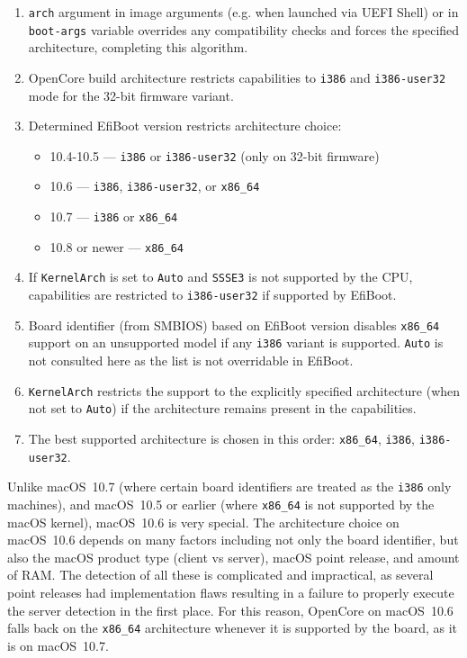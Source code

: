 \documentclass[]{article}
\providecommand{\tightlist}{%
  \setlength{\itemsep}{0pt}\setlength{\parskip}{0pt}}
\begin{document}
\begin{enumerate}
  \begin{enumerate}
    \tightlist
    \item \texttt{arch} argument in image arguments (e.g. when launched
    via UEFI Shell) or in \texttt{boot-args} variable overrides any compatibility
    checks and forces the specified architecture, completing this algorithm.
    \item OpenCore build architecture restricts capabilities to \texttt{i386}
      and \texttt{i386-user32} mode for the 32-bit firmware variant.
    \item Determined EfiBoot version restricts architecture choice:
      \begin{itemize}
      \item 10.4-10.5 --- \texttt{i386} or \texttt{i386-user32} (only on 32-bit firmware)
      \item 10.6 --- \texttt{i386}, \texttt{i386-user32}, or \texttt{x86\_64}
      \item 10.7 --- \texttt{i386} or \texttt{x86\_64}
      \item 10.8 or newer --- \texttt{x86\_64}
      \end{itemize}
    \item If \texttt{KernelArch} is set to \texttt{Auto} and \texttt{SSSE3}
      is not supported by the CPU, capabilities are restricted to \texttt{i386-user32}
      if supported by EfiBoot.
    \item Board identifier (from SMBIOS) based on EfiBoot version
      disables \texttt{x86\_64} support on an unsupported model
      if any \texttt{i386} variant is supported. \texttt{Auto}
      is not consulted here as the list is not overridable in EfiBoot.
    \item \texttt{KernelArch} restricts the support to the explicitly
      specified architecture (when not set to \texttt{Auto}) if
      the architecture remains present in the capabilities.
    \item The best supported architecture is chosen in this order:
      \texttt{x86\_64}, \texttt{i386}, \texttt{i386-user32}.
  \end{enumerate}

  Unlike macOS~10.7 (where certain board identifiers are treated as the \texttt{i386}
  only machines), and macOS~10.5 or earlier (where \texttt{x86\_64} is not supported
  by the macOS kernel), macOS~10.6 is very special. The architecture choice on macOS~10.6
  depends on many factors including not only the board identifier, but also the macOS
  product type (client vs server), macOS point release, and amount of RAM. The detection
  of all these is complicated and impractical, as several point releases had implementation
  flaws resulting in a failure to properly execute the server detection in the first place.
  For this reason, OpenCore on macOS~10.6 falls back on the \texttt{x86\_64}
  architecture whenever it is supported by the board, as it is on macOS~10.7.


\end{enumerate}
\end{document}
